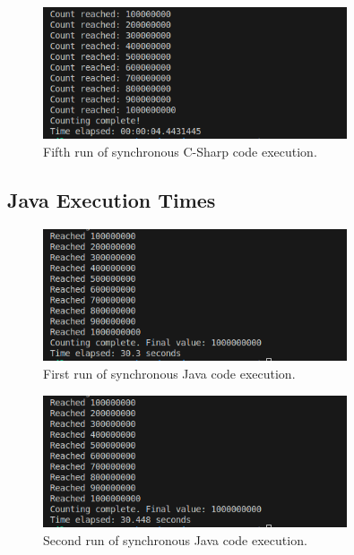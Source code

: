 \documentclass{article}
\begin{document}
\begin{figure}[htbp]
    \centering
    \includegraphics[width=0.8\textwidth]{../records/results_cs/result_5.png}
    \caption{Fifth run of synchronous C-Sharp code execution.}
    \label{fig:C-Sharp-runtime-5}
\end{figure}

\clearpage
\subsection{Java Execution Times} 

\begin{figure}[htbp]
    \centering
    \includegraphics[width=0.8\textwidth]{../records/results_java/result_1.png}
    \caption{First run of synchronous Java code execution.}
    \label{fig:Java-runtime-1}
\end{figure}

\begin{figure}[htbp]
    \centering
    \includegraphics[width=0.8\textwidth]{../records/results_java/result_2.png}
    \caption{Second run of synchronous Java code execution.}
    \label{fig:Java-runtime-2}
\end{figure}
\end{document}
